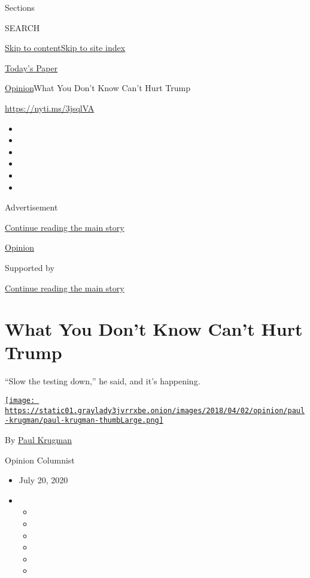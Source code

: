 Sections

SEARCH

\protect\hyperlink{site-content}{Skip to
content}\protect\hyperlink{site-index}{Skip to site index}

\href{https://myaccount.nytimes3xbfgragh.onion/auth/login?response_type=cookie\&client_id=vi}{}

\href{https://www.nytimes3xbfgragh.onion/section/todayspaper}{Today's
Paper}

\href{/section/opinion}{Opinion}\textbar{}What You Don't Know Can't Hurt
Trump

\href{https://nyti.ms/3jsqlVA}{https://nyti.ms/3jsqlVA}

\begin{itemize}
\item
\item
\item
\item
\item
\item
\end{itemize}

Advertisement

\protect\hyperlink{after-top}{Continue reading the main story}

\href{/section/opinion}{Opinion}

Supported by

\protect\hyperlink{after-sponsor}{Continue reading the main story}

\hypertarget{what-you-dont-know-cant-hurt-trump}{%
\section{What You Don't Know Can't Hurt
Trump}\label{what-you-dont-know-cant-hurt-trump}}

``Slow the testing down,'' he said, and it's happening.

\href{https://www.nytimes3xbfgragh.onion/by/paul-krugman}{\texttt{[image: https://static01.graylady3jvrrxbe.onion/images/2018/04/02/opinion/paul-krugman/paul-krugman-thumbLarge.png]}}

By \href{https://www.nytimes3xbfgragh.onion/by/paul-krugman}{Paul
Krugman}

Opinion Columnist

\begin{itemize}
\item
  July 20, 2020
\item
  \begin{itemize}
  \item
  \item
  \item
  \item
  \item
  \item
  \end{itemize}
\end{itemize}

